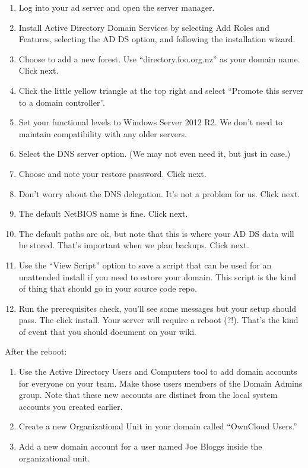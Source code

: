 \documentclass{article}
\begin{document}
\begin{enumerate}
	\item Log into your ad server and open the server manager.
	\item Install Active Directory Domain Services by selecting Add Roles and Features, selecting the AD DS option, and following the installation wizard.
	\item Choose to add a new forest. Use ``directory.foo.org.nz'' as your domain name. Click next.
        \item Click the little yellow triangle at the top right and select ``Promote this server to a domain controller''.		
	\item Set your functional levels to Windows Server 2012 R2. We don't need to maintain compatibility with any older servers.
	\item Select the DNS server option. (We may not even need it, but just in case.)
	\item Choose and note your restore password. Click next.
	\item Don't worry about the DNS delegation. It's not a problem for us. Click next.
	\item The default NetBIOS name is fine. Click next.
	\item The default paths are ok, but note that this is where your AD DS data will be stored. That's important when we plan backups. Click next.
	\item Use the ``View Script'' option to save a script that can be used for an unattended install if you need to estore your domain. This script is the kind of thing that should go in your source code repo.
	\item Run the prerequisites check, you'll see some messages but your setup should pass. The click install.  Your server will require a reboot (?!). That's the kind of event that you should document on your wiki.
\end{enumerate}

After the reboot:
\begin{enumerate}
	\item Use the Active Directory Users and Computers tool to add domain accounts for everyone on your team.  Make those users members of the Domain Admins group. Note that these new accounts are distinct from the local system accounts you created earlier.
	\item Create a new Organizational Unit in your domain called ``OwnCloud  Users.''
	\item Add a new domain account for a user named Joe Bloggs inside the organizational unit.
\end{enumerate}
\end{document}
